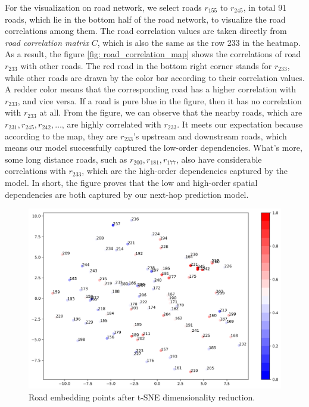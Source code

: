 For the visualization on road network, we select roads $r_{155}$ to $r_{245}$, in total 91 roads, which lie in the bottom half of the road network, to visualize the road correlations among them. The road correlation values are taken directly from \textit{road correlation matrix} $C$, which is also the same as the row 233 in the heatmap. As a result, the figure \ref{fig: road_correlation_map} shows the correlations of road $r_{233}$ with other roads. The red road in the bottom right corner stands for $r_{233}$, while other roads are drawn by the color bar according to their correlation values. A redder color means that the corresponding road has a higher correlation with $r_{233}$, and vice versa. If a road is pure blue in the figure, then it has no correlation with $r_{233}$ at all. From the figure, we can observe that the nearby roads, which are $r_{231}, r_{245}, r_{242}, \dots$, are highly correlated with $r_{233}$. It meets our expectation because according to the map, they are $r_{233}$'s upstream and downstream roads, which means our model successfully captured the low-order dependencies. What's more, some long distance roads, such as $r_{200}, r_{181}, r_{177}$, also have considerable correlations with $r_{233}$, which are the high-order dependencies captured by the model. In short, the figure proves that the low and high-order spatial dependencies are both captured by our next-hop prediction model.


\begin{figure}[htb]
    \centering
    \includegraphics[width=\textwidth]{images/road_tsne.png}
    \caption{Road embedding points after t-SNE dimensionality reduction.}
    \label{fig: road_correlation_tsne}
\end{figure}

